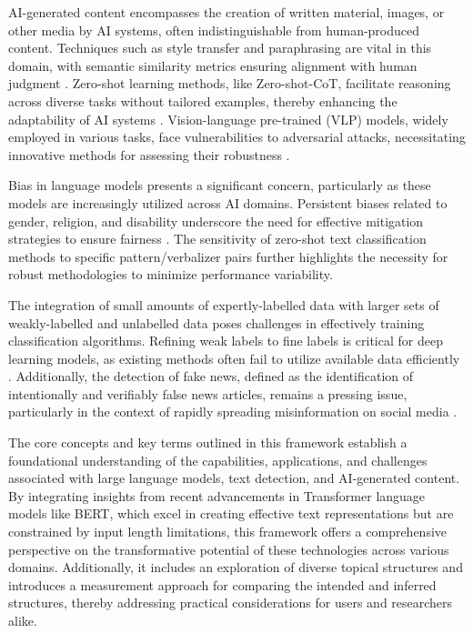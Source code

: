 AI-generated content encompasses the creation of written material, images, or other media by AI systems, often indistinguishable from human-produced content. Techniques such as style transfer and paraphrasing are vital in this domain, with semantic similarity metrics ensuring alignment with human judgment \cite{yamshchikov2020styletransferparaphraselookingsensible}. Zero-shot learning methods, like Zero-shot-CoT, facilitate reasoning across diverse tasks without tailored examples, thereby enhancing the adaptability of AI systems \cite{kojima2022large}. Vision-language pre-trained (VLP) models, widely employed in various tasks, face vulnerabilities to adversarial attacks, necessitating innovative methods for assessing their robustness \cite{zhang2024universaladversarialperturbationsvisionlanguage}.



Bias in language models presents a significant concern, particularly as these models are increasingly utilized across AI domains. Persistent biases related to gender, religion, and disability underscore the need for effective mitigation strategies to ensure fairness \cite{nimase2024morecontextshelpsarcasm}. The sensitivity of zero-shot text classification methods to specific pattern/verbalizer pairs further highlights the necessity for robust methodologies to minimize performance variability.



The integration of small amounts of expertly-labelled data with larger sets of weakly-labelled and unlabelled data poses challenges in effectively training classification algorithms. Refining weak labels to fine labels is critical for deep learning models, as existing methods often fail to utilize available data efficiently \cite{wu2015largescaleonlinefeatureselection}. Additionally, the detection of fake news, defined as the identification of intentionally and verifiably false news articles, remains a pressing issue, particularly in the context of rapidly spreading misinformation on social media \cite{shu2017fakenewsdetectionsocial}.



The core concepts and key terms outlined in this framework establish a foundational understanding of the capabilities, applications, and challenges associated with large language models, text detection, and AI-generated content. By integrating insights from recent advancements in Transformer language models like BERT, which excel in creating effective text representations but are constrained by input length limitations, this framework offers a comprehensive perspective on the transformative potential of these technologies across various domains. Additionally, it includes an exploration of diverse topical structures and introduces a measurement approach for comparing the intended and inferred structures, thereby addressing practical considerations for users and researchers alike. \cite{ginzburg2021selfsuperviseddocumentsimilarityranking,shi2019newevaluationframeworktopic}



